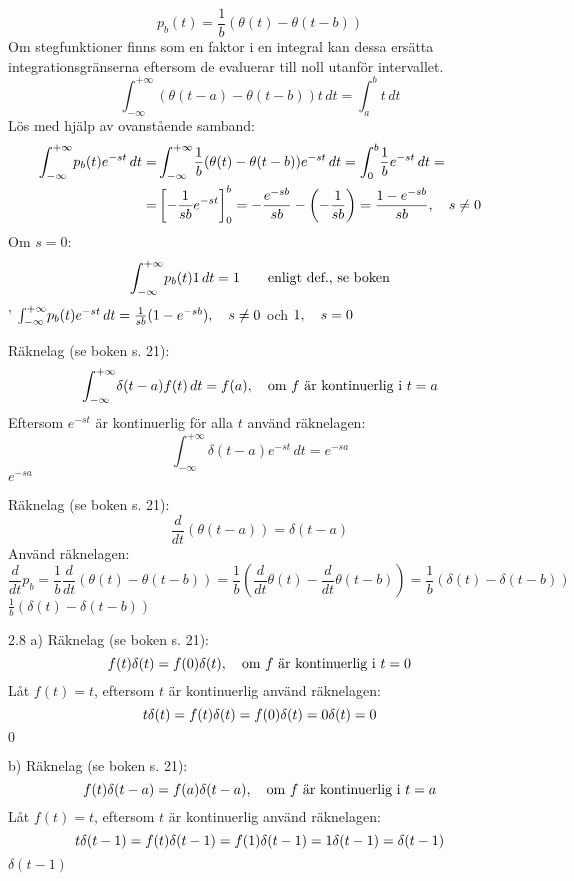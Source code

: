 \pagebreak
\begin{task}{2.5}
	\[p_b(t)=\frac{1}{b}(\theta(t)-\theta(t-b))\]
	Om stegfunktioner finns som en faktor i en integral kan dessa ersätta integrationsgränserna eftersom de evaluerar till noll utanför intervallet.
	\[\int_{-\infty}^{+\infty}\! (\theta(t-a)-\theta(t-b))t \, dt =
	\int_{a}^{b}\! t \, dt\]
	Lös med hjälp av ovanstående samband:
	\begin{align*}
	\int_{-\infty}^{+\infty}\! p_b(t)e^{-st} \, dt =
	&\int_{-\infty}^{+\infty}\!\frac{1}{b}(\theta(t)-\theta(t-b))e^{-st} \, dt =
	\int_{0}^{b}\!\frac{1}{b}e^{-st} \, dt = \\ =
	&\left[-\frac{1}{sb}e^{-st}\right]_{0}^{b}=
	-\frac{e^{-sb}}{sb}-\left(-\frac{1}{sb}\right)=
	\frac{1-e^{-sb}}{sb}, \quad s\neq0
	\end{align*}
	Om $s=0$:
	\[\int_{-\infty}^{+\infty}\! p_b(t)\*1 \, dt =1 \qquad\text{enligt def., se boken}\]'
	\ans $\int_{-\infty}^{+\infty}\! p_b(t)e^{-st} \, dt =\frac{1}{sb}(1-e^{-sb}), \quad s\neq0$ och $1, \quad s=0$
\end{task}

\begin{task}{2.6}
	Räknelag (se boken s. 21):
	\[\int_{-\infty}^{+\infty}\! \delta(t-a)f(t) \, dt =f(a), \quad \text{om } f \text{ är kontinuerlig i }t=a\]
	Eftersom $e^{-st}$ är kontinuerlig för alla $t$ använd räknelagen:
	\[\int_{-\infty}^{+\infty}\! \delta(t-a)e^{-st} \, dt =
	e^{-sa}\]
	\ans $e^{-sa}$
\end{task}

\begin{task}{2.7}
	Räknelag (se boken s. 21):
	\[\frac{d}{dt}(\theta(t-a))=\delta(t-a)\]
	Använd räknelagen:
	\[\frac{d}{dt}p_b=
	\frac{1}{b}\frac{d}{dt}(\theta(t)-\theta(t-b))=
	\frac{1}{b}\left(\frac{d}{dt}\theta(t)-\frac{d}{dt}\theta(t-b)\right)=
	\frac{1}{b}\left(\delta(t)-\delta(t-b)\right)\]
	\ans $\frac{1}{b}\left(\delta(t)-\delta(t-b)\right)$
\end{task}

\begin{task}{2.8 a)}
	Räknelag (se boken s. 21):
	\[f(t)\delta(t)=f(0)\delta(t), \quad \text{om } f \text{ är kontinuerlig i }t=0\]
	Låt $f(t)=t$, eftersom $t$ är kontinuerlig använd räknelagen:
	\[t\delta(t)=
	f(t)\delta(t)=
	f(0)\delta(t)=
	0\*\delta(t)=
	0\]
	\ans $0$
\end{task}

\begin{task}{b)}
	Räknelag (se boken s. 21):
	\[f(t)\delta(t-a)=f(a)\delta(t-a), \quad \text{om } f \text{ är kontinuerlig i }t=a\]
	Låt $f(t)=t$, eftersom $t$ är kontinuerlig använd räknelagen:
	\[t\delta(t-1)=
	f(t)\delta(t-1)=
	f(1)\delta(t-1)=
	1\*\delta(t-1)=
	\delta(t-1)\]
	\ans $\delta(t-1)$
\end{task}

